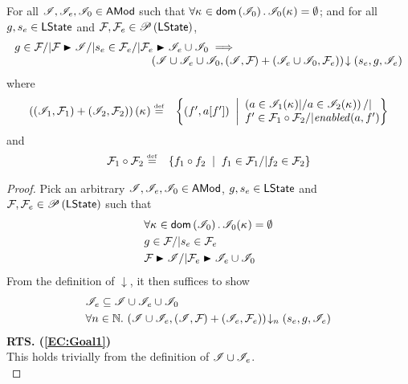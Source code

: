 \newpage	
%
\begin{lemma}\label{lem:extend-closure}
%
For all $\mathscr{I}, \mathscr{I}_{e}, \mathscr{I}_{0} \in \textsf{AMod}$ such that $\forall \kappa_{} \in \textsf{dom}\left( \mathscr{I}_0 \right).\, \mathscr{I}_0(\kappa_{}) = \emptyset$; and for all $g, s_e \in \textsf{LState}$ and $\mathcal{F}_{}, \mathcal{F}_{e} \in \mathscr{P}\left(\textsf{LState} \right)$,
\[
\begin{array}{l l}
	g \in \fence{} /| \fence{} \strictfences \lmod /| s_e \in \fence{e} /| \fence{e} \strictfences \lmod_e \cup \lmod_0
	\implies & \\
	& \hspace{-3cm} \extendsAM{\lmod \cup \lmod_{e} \cup \lmod_0, (\lmod, \fence{}) + (\lmod_{e} \cup \lmod_0, \fence{e}) }{s_{e}}{g}{\lmod_{e}}
\end{array}
\]
%
where
%
\[
\begin{array}{@{} l  l @{}}
	\left( (\lmod_1, \fence{1}) + (\lmod_{2}, \fence{2}) \right)(\ca{}) \eqdef  & 
	\left\{
		(f', a[f']) \;\;\middle|
		\begin{array}{ l @{}}
			\left(a \in \lmod_{1}(\ca{}) |/ a \in \lmod_{2}(\ca{})  \right) /| \\
			f' \in \fence{1} \composeL \fence{2} /| \m{enabled}(a, f')	
		\end{array}		  
	\right\}\\
\end{array}
\]
%
and
%
\[
\begin{array}{@{} l l @{}}
	\fence{1} \composeL \fence{2} \eqdef & 
	\left\{
		f_{1} \composeL f_{2} \;\;\middle|\;\; 
		f_{1} \in \fence{1} /| f_{2} \in \fence{2}
	\right\}
\end{array}
\]
%
\begin{proof} Pick an arbitrary $\mathscr{I}, \mathscr{I}_e, \mathscr{I}_0 \in \textsf{AMod}$, $g, s_e \in \textsf{LState}$ and $\mathcal{F}_{}, \mathcal{F}_{e} \in \mathscr{P}\left(\textsf{LState} \right)$ such that 
%
\begin{align}
	& \for{\ca{} \in \dom{\lmod_0}} \lmod_0(\ca{}) = \emptyset \label{EC:Ass0}\\
	& g \in \fence{} /|  s_e \in \fence{e}   \label{EC:Ass1}\\
	& \fence{} \strictfences \lmod /| \fence{e} \strictfences \lmod_e \cup \lmod_0 \label{EC:Ass2}
\end{align} 
%
From the definition of $\downarrow$, it then suffices to show
%
\begin{align}
	& \mathscr{I}_e \subseteq \mathscr{I} \cup \mathscr{I}_e \cup \mathscr{I}_0 \label{EC:Goal1}\\
	& \forall n \in \mathbb{N}.\,  \left(\mathscr{I} \cup \mathscr{I}_e, (\mathscr{I}, \mathcal{F}_{}) + (\mathscr{I}_{e}, \mathcal{F}_{e})\right) \!\downarrow_{n} \left(s_e, g, \mathscr{I}_e\right) \label{EC:Goal2}
\end{align}
%
\noindent\textbf{RTS. (\ref{EC:Goal1})} \\
This holds trivially from the definition of $\mathscr{I} \cup \mathscr{I}_e$.\\


\end{proof}
\end{lemma}
